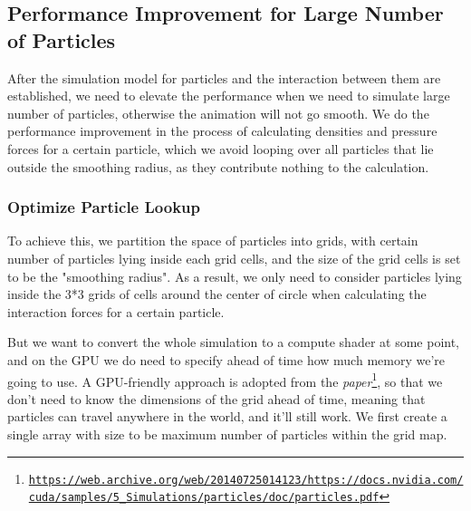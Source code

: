 \documentclass{article}
\newcommand\foothref[3]{#1\footnote{\href{#2}{#3}}}
\begin{document}
\subsection{Performance Improvement for Large Number of Particles}
\hspace{1em} After the simulation model for particles and the interaction between them are established, we need to elevate the performance when we need to simulate large number of particles, otherwise the animation will not go smooth. We do the performance improvement in the process of calculating densities and pressure forces for a certain particle, which we avoid looping over all particles that lie outside the smoothing radius, as they contribute nothing to the calculation.

\subsubsection{Optimize Particle Lookup}

\hspace{1em}To achieve this, we partition the space of particles into grids, with certain number of particles lying inside each grid cells, and the size of the grid cells is set to be the "smoothing radius". As a result, we only need to consider particles lying inside the 3*3 grids of cells around the center of circle when calculating the interaction forces for a certain particle. 

But we want to convert the whole simulation to a compute shader at some point, and on the GPU we do need  to specify ahead of time how much memory we’re going to use. A GPU-friendly approach is adopted from the  \foothref{\textit{paper}}{https://web.archive.org/web/20140725014123/https://docs.nvidia.com/cuda/samples/5\_Simulations/particles/doc/particles.pdf}{\texttt{https://web.archive.org/web/20140725014123/https://docs.nvidia.com/cuda/sam\-ples/5\_Simulations/particles/doc/particles.pdf}}, so that we don’t need to know the dimensions of the grid ahead of time, meaning that particles can travel anywhere in the world, and it’ll still work. We first create a single array with size to be maximum number of particles within the grid map. 
\end{document}
